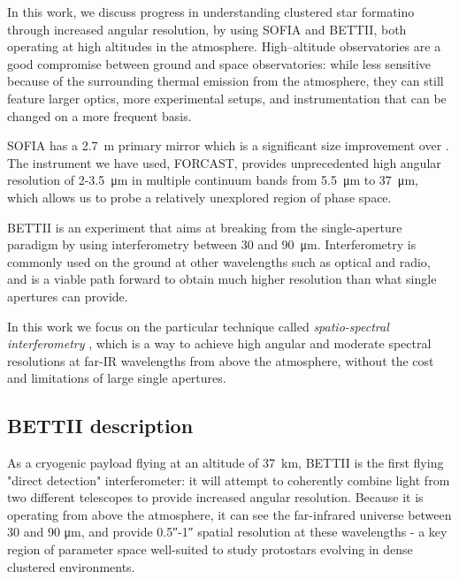 In this work, we discuss progress in understanding clustered star formatino through increased angular resolution, by using SOFIA and BETTII, both operating at high altitudes in the atmosphere. High--altitude observatories are a good compromise between ground and space observatories: while less sensitive because of the surrounding thermal emission from the atmosphere, they can still feature larger optics, more experimental setups, and instrumentation that can be changed on a more frequent basis.

SOFIA has a \SI{2.7}{\meter} primary mirror which is a significant size improvement over \Spitzer. The instrument we have used, FORCAST, provides unprecedented high angular resolution of 2-3.5~\si{\micro\meter} in multiple continuum bands from \SI{5.5}{\micro\meter} to \SI{37}{\micro\meter}, which allows us to probe a relatively unexplored region of phase space.

BETTII is an experiment that aims at breaking from the single-aperture paradigm by using interferometry between 30 and \SI{90}{\micro\meter}. Interferometry is commonly used on the ground at other wavelengths such as optical and radio, and is a viable path forward to obtain much higher resolution than what single apertures can provide. 

In this work we focus on the particular technique called \textit{spatio-spectral interferometry} \citep{Mariotti:1988vea}, which is a way to achieve 
high angular and moderate spectral resolutions at far-IR wavelengths from above the atmosphere, without the cost and limitations of large single apertures. 


\subsection{BETTII description}

As a cryogenic payload flying at an altitude of \SI{37}{\kilo\meter}, BETTII is the first flying "direct detection" interferometer: it will attempt to coherently combine light from two different telescopes to provide increased angular resolution. Because it is operating from above the atmosphere, it can see the far-infrared universe between 30 and 90 \si{\micro\meter}, and provide \ang{;;0.5}-\ang{;;1} spatial resolution at these wavelengths - a key region of parameter space well-suited to study protostars evolving in dense clustered environments.

